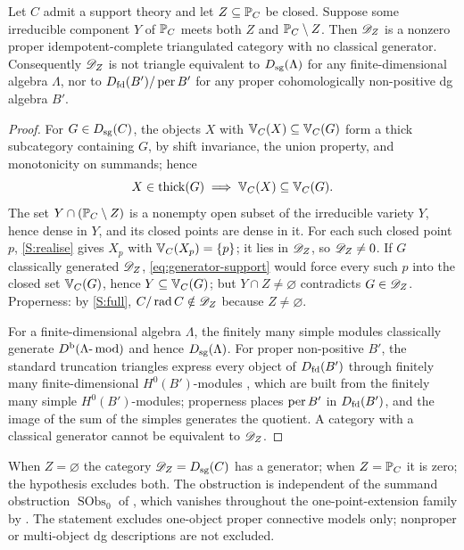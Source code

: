 \begin{theorem}\label{thm:no-generator}
Let \(C\) admit a support theory and let \(Z\subseteq\mathbb P_C\) be closed.  Suppose some irreducible component \(Y\) of \(\mathbb P_C\) meets both \(Z\) and \(\mathbb P_C\setminus Z\).  Then \(\mathscr D_Z\) is a nonzero proper idempotent-complete triangulated category with no classical generator.  Consequently \(\mathscr D_Z\) is not triangle equivalent to \(D_{\mathrm{sg}}(\Lambda)\) for any finite-dimensional algebra \(\Lambda\), nor to \(D_{\mathrm{fd}}(B')/\operatorname{per} B'\) for any proper cohomologically non-positive dg algebra \(B'\).
\end{theorem}

\begin{proof}
For \(G\in D_{\mathrm{sg}}(C)\), the objects \(X\) with \(\mathbb V_C(X)\subseteq\mathbb V_C(G)\) form a thick subcategory containing \(G\), by shift invariance, the union property, and monotonicity on summands; hence
\begin{equation}\label{eq:generator-support}
 X\in\operatorname{thick}(G)\implies\mathbb V_C(X)\subseteq\mathbb V_C(G).
\end{equation}
The set \(Y\cap(\mathbb P_C\setminus Z)\) is a nonempty open subset of the irreducible variety \(Y\), hence dense in \(Y\), and its closed points are dense in it.  For each such closed point \(p\), \ref{S:realise} gives \(X_p\) with \(\mathbb V_C(X_p)=\{p\}\); it lies in \(\mathscr D_Z\), so \(\mathscr D_Z\ne0\).  If \(G\) classically generated \(\mathscr D_Z\), \eqref{eq:generator-support} would force every such \(p\) into the closed set \(\mathbb V_C(G)\), hence \(Y\subseteq\mathbb V_C(G)\); but \(Y\cap Z\ne\varnothing\) contradicts \(G\in\mathscr D_Z\).  Properness: by \ref{S:full}, \(C/\operatorname{rad} C\notin\mathscr D_Z\) because \(Z\ne\varnothing\).

For a finite-dimensional algebra \(\Lambda\), the finitely many simple modules classically generate \(D^{\mathrm b}(\Lambda\text{-}\operatorname{mod})\) and hence \(D_{\mathrm{sg}}(\Lambda)\).  For proper non-positive \(B'\), the standard truncation triangles express every object of \(D_{\mathrm{fd}}(B')\) through finitely many finite-dimensional \(H^0(B')\)-modules , which are built from the finitely many simple \(H^0(B')\)-modules; properness places \(\operatorname{per} B'\) in \(D_{\mathrm{fd}}(B')\), and the image of the sum of the simples generates the quotient.  A category with a classical generator cannot be equivalent to \(\mathscr D_Z\).
\end{proof}

\begin{remark}
When \(Z=\varnothing\) the category \(\mathscr D_Z=D_{\mathrm{sg}}(C)\) has a generator; when \(Z=\mathbb P_C\) it is zero; the hypothesis excludes both.  The obstruction is independent of the summand obstruction \(\operatorname{SObs}_0\) of , which vanishes throughout the one-point-extension family by .  The statement excludes one-object proper connective models only; nonproper or multi-object dg descriptions are not excluded.
\end{remark}

